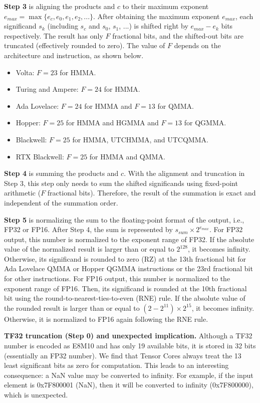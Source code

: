 \textbf{Step 3} is aligning the products and $c$ to their maximum exponent $e_{max}=\max \{e_c, e_0, e_1, e_2, ...\}$.
After obtaining the maximum exponent $e_{max}$, each significand $s_k$ (including $s_c$ and $s_0$, $s_1$, ...) is shifted right by $e_{max}-e_k$ bits respectively. The result has only $F$ fractional bits, and the shifted-out bits are truncated (effectively rounded to zero). The value of $F$ depends on the architecture and instruction, as shown below.

\begin{itemize}
    \item Volta: $F=23$ for HMMA.
    \item Turing and Ampere: $F=24$ for HMMA.
    \item Ada Lovelace: $F=24$ for HMMA and $F=13$ for QMMA.
    \item Hopper: $F=25$ for HMMA and HGMMA and $F=13$ for QGMMA.
    \item Blackwell: $F=25$ for HMMA, UTCHMMA, and UTCQMMA.
    \item RTX Blackwell: $F=25$ for HMMA and QMMA.
\end{itemize}

\textbf{Step 4} is summing the products and $c$. With the alignment and truncation in Step 3, this step only needs to sum the shifted significands using fixed-point arithmetic ($F$ fractional bits). Therefore, the result of the summation is exact and independent of the summation order.

\textbf{Step 5} is normalizing the sum to the floating-point format of the output, i.e., FP32 or FP16. After Step 4, the sum is represented by $s_{sum}\times 2^{e_{max}}$. For FP32 output, this number is normalized to the exponent range of FP32. If the absolute value of the normalized result is larger than or equal to $2^{128}$, it becomes infinity. Otherwise, its significand is rounded to zero (RZ) at the 13th fractional bit for Ada Lovelace QMMA or Hopper QGMMA instructions or the 23rd fractional bit for other instructions. For FP16 output, this number is normalized to the exponent range of FP16. Then, its significand is rounded at the 10th fractional bit using the round-to-nearest-ties-to-even (RNE) rule. If the absolute value of the rounded result is larger than or equal to $(2-2^{11})\times2^{15}$, it becomes infinity. Otherwise, it is normalized to FP16 again following the RNE rule. 

\textbf{TF32 truncation (Step 0) and unexpected implication.} Although a TF32 number is encoded as E8M10 and has only 19 available bits, it is stored in 32 bits (essentially an FP32 number). We find that Tensor Cores always treat the 13 least significant bits as zero for computation. This leads to an interesting consequence: a NaN value may be converted to infinity. For example, if the input element is 0x7F800001 (NaN), then it will be converted to infinity (0x7F800000), which is unexpected.

